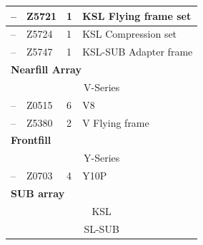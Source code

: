 \begin{longtable}[H]{|llll|}
            \multicolumn{1}{|l|}{--}              & \multicolumn{1}{l|}{Z5721}                  & \multicolumn{1}{l|}{1}              & KSL Flying frame set       \\ \hline
            \multicolumn{1}{|l|}{--}              & \multicolumn{1}{l|}{Z5724}                  & \multicolumn{1}{l|}{1}              & KSL Compression set        \\ \hline
            \multicolumn{1}{|l|}{--}              & \multicolumn{1}{l|}{Z5747}                  & \multicolumn{1}{l|}{1}              & KSL-SUB Adapter frame      \\ \hline
            \multicolumn{4}{|l|}{\textbf{Nearfill Array}}                                                                                                          \\ \hline
            \multicolumn{4}{|c|}{V-Series}                                                                                                                         \\ \hline
            \multicolumn{1}{|l|}{--}              & \multicolumn{1}{l|}{Z0515}                  & \multicolumn{1}{l|}{6}              & V8                         \\ \hline
            \multicolumn{1}{|l|}{--}              & \multicolumn{1}{l|}{Z5380}                  & \multicolumn{1}{l|}{2}              & V Flying frame             \\ \hline
            \multicolumn{4}{|l|}{\textbf{Frontfill}}                                                                                                               \\ \hline
            \multicolumn{4}{|c|}{Y-Series}                                                                                                                         \\ \hline
            \multicolumn{1}{|l|}{--}              & \multicolumn{1}{l|}{Z0703}                  & \multicolumn{1}{l|}{4}              & Y10P                       \\ \hline
            \multicolumn{4}{|l|}{\textbf{SUB array}}                                                                                                               \\ \hline
            \multicolumn{4}{|c|}{KSL}                                                                                                                              \\ \hline
            \multicolumn{4}{|c|}{SL-SUB}                                                                                                                           \\ \hline

\end{longtable}
